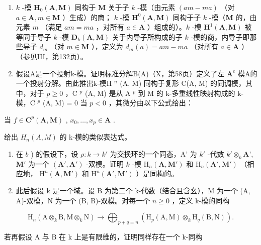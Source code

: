 \begin{enumerate}
\def\labelenumi{\alph{enumi})}
\item
  \(k\) -模 \(\mathbf{H}_0(\mathbf{A}, \mathbf{M})\) 同构于 \(\mathbf{M}\) 关于子 \(k\) -模（由元素 \((am - ma)\) （对 \(a \in \mathbf{A}, m \in \mathbf{M}\) ）生成）的商； \(k\) -模 \(\mathbf{H}^0(\mathbf{A}, \mathbf{M})\) 同构于子 \(k\) -模（\(\mathbf{M}\) 的，由元素 \(m\) （满足 \(am = ma\) ，对所有 \(a \in \mathbf{A}\) ）组成的）。\(k\) -模 \(\mathbf{H}^1(\mathbf{A}, \mathbf{M})\) 被等同于导子 \(k\) -模 \(\mathbf{D}_k(\mathbf{A}, \mathbf{M})\) 关于内导子所构成的子 \(k\) -模的商，内导子即那些导子 \(d_m\) （对 \(m \in \mathbf{M}\) ），定义为 \(d_m(a) = am - ma\) （对所有 \(a \in \mathbf{A}\) ）（参见III，第132页）。
\item
  假设A是一个投射k-模。证明标准分解B(A)（X，第58页）定义了左 \(\mathbf{A}^{e}\) 模A的一个投射分解。由此推出k-模H \(^{n}\) (A, M) 同构于复形 C(A, M) 的同调模，其中，对于 \(p \geqslant 0\) ，C \(^{p}\) (A, M) 是从 A \(^{p}\) 到 M 的 k-多重线性映射构成的 k-模，C \(^{p}\) (A, M) = 0 当 \(p < 0\) ，其微分由以下公式给出：
\end{enumerate}

当 \(f \in \mathbf{C}^p(\mathbf{A}, \mathbf{M})\) , \(x_0, \ldots, x_p \in \mathbf{A}\) .

给出 \(H_{n}(A, M)\) 的 k-模的类似表达式。

\begin{enumerate}
\def\labelenumi{\alph{enumi})}
\setcounter{enumi}{2}
\item
  在 \(b\) ) 的假设下，设 \(\rho : k \to k'\) 为交换环的一个同态，A' 为 \(k'\) -代数 \(k' \otimes_k \mathbf{A}\)', \(\mathbf{M}'\) 为一个 \((\mathbf{A}', \mathbf{A}')\) -双模。证明 \(k\) -模 \(\mathrm{H}_n(\mathbf{A}, \mathbf{M}')\) 和 \(\mathrm{H}_n(\mathbf{A}', \mathbf{M}')\) （相应地， \(\mathrm{H}^n(\mathbf{A}, \mathbf{M}')\) 和 \(\mathrm{H}^n(\mathbf{A}', \mathbf{M}')\) ）是同构的。
\item
  此后假设 k 是一个域。设 B 为第二个 k-代数（结合且含幺），M 为一个 (A, A)-双模，N 为一个 (B, B)-双模。对每一个 \(n \geqslant 0\) ，定义 k-模的同构
\end{enumerate}

\[
\mathrm{H} _ {n} (\mathrm{A} \otimes_ {k} \mathrm{B}, \mathrm{M} \otimes_ {k} \mathrm{N}) \rightarrow \bigoplus_ {p + q = n} \left(\mathrm{H} _ {p} (\mathrm{A}, \mathrm{M}) \otimes_ {k} \mathrm{H} _ {q} (\mathrm{B}, \mathrm{N})\right).
\]

若再假设 A 与 B 在 k 上是有限维的，证明同样存在一个 k-同构

